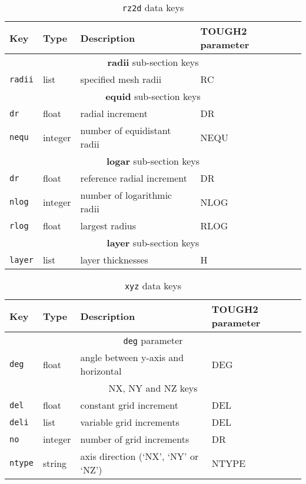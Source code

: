 \begin{table}
  \begin{center}
    \begin{tabular}{|l|l|l|l|}
      \hline
      \textbf{Key} & \textbf{Type} & \textbf{Description} & \textbf{TOUGH2 parameter}\\
      \hline
      \multicolumn{4}{|c|}{\textbf{radii} sub-section keys}\\
      \hline
      \texttt{radii} & list & specified mesh radii & RC\\
      \hline
      \multicolumn{4}{|c|}{\textbf{equid} sub-section keys}\\
      \hline
      \texttt{dr} & float & radial increment & DR\\
      \texttt{nequ} & integer & number of equidistant radii & NEQU\\
      \hline
      \multicolumn{4}{|c|}{\textbf{logar} sub-section keys}\\
      \hline
      \texttt{dr} & float & reference radial increment & DR\\
      \texttt{nlog} & integer & number of logarithmic radii & NLOG\\
      \texttt{rlog} & float & largest radius & RLOG\\
      \hline
      \multicolumn{4}{|c|}{\textbf{layer} sub-section keys}\\
      \hline
      \texttt{layer} & list & layer thicknesses & H\\
      \hline
    \end{tabular}
    \caption{\texttt{rz2d} data keys}
    \label{tb:rz2d}
  \end{center}
\end{table}

\begin{table}
  \begin{center}
    \begin{tabular}{|l|l|l|l|}
      \hline
      \textbf{Key} & \textbf{Type} & \textbf{Description} & \textbf{TOUGH2 parameter}\\
      \hline
      \multicolumn{4}{|c|}{\texttt{deg} parameter}\\
      \hline
      \texttt{deg} & float & angle between y-axis and horizontal & DEG\\
      \hline
      \multicolumn{4}{|c|}{NX, NY and NZ keys}\\
      \hline
      \texttt{del} & float & constant grid increment & DEL\\
      \texttt{deli} & list & variable grid increments & DEL\\
      \texttt{no} & integer & number of grid increments & DR\\
      \texttt{ntype} & string & axis direction (`NX', `NY' or `NZ') & NTYPE\\
      \hline
    \end{tabular}
    \caption{\texttt{xyz} data keys}
    \label{tb:xyz}
  \end{center}
\end{table}


